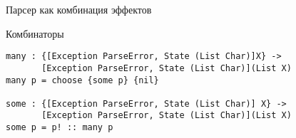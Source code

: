 \begin{frame}[fragile]{Парсер как комбинация эффектов}
\begin{block}{Комбинаторы }
\begin{verbatim}
many : {[Exception ParseError, State (List Char)]X} ->
       [Exception ParseError, State (List Char)](List X)
many p = choose {some p} {nil}

some : {[Exception ParseError, State (List Char)] X} ->
       [Exception ParseError, State (List Char)](List X)
some p = p! :: many p
\end{verbatim}
\end{block}
\end{frame}



